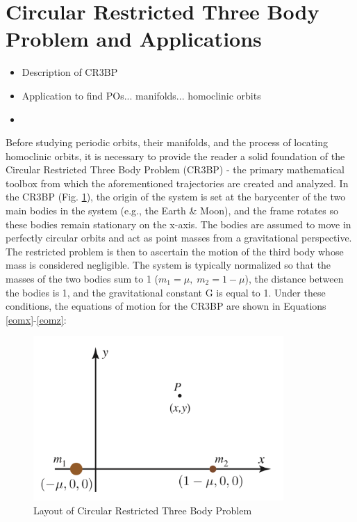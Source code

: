 \documentclass[11pt]{article} %
\begin{document}
\section*{Circular Restricted Three Body Problem and Applications}
\begin{itemize}
	\item \color{red}Description of CR3BP
	\item Application to find POs... manifolds... homoclinic orbits
	\item \color{black}
\end{itemize}
Before studying periodic orbits, their manifolds, and the process of locating homoclinic orbits, it is necessary to provide the reader a solid foundation of the Circular Restricted Three Body Problem (CR3BP) - the primary mathematical toolbox from which the aforementioned trajectories are created and analyzed. In the CR3BP (Fig. \ref{fig:CR3BP}), the origin of the system is set at the barycenter of the two main bodies in the system (e.g., the Earth \& Moon), and the frame rotates so these bodies remain stationary on the x-axis. The bodies are assumed to move in perfectly circular orbits and act as point masses from a gravitational perspective. The restricted problem is then to ascertain the motion of the third body whose mass is considered negligible. The system is typically normalized so that the masses of the two bodies sum to 1 ($m_1 = \mu,\; m_2 = 1-\mu$), the distance between the bodies is 1, and the gravitational constant G is equal to 1. Under these conditions, the equations of motion for the CR3BP are shown in Equations \ref{eomx}-\ref{eomz}:

\begin{figure}[H]
\centering
\includegraphics[width=3.75in]{CR3BP.png}\nonumber
\caption{Layout of Circular Restricted Three Body Problem \cite{KoonLoMarsdenRoss2011}}
\label{fig:CR3BP}
\end{figure}
\end{document}
